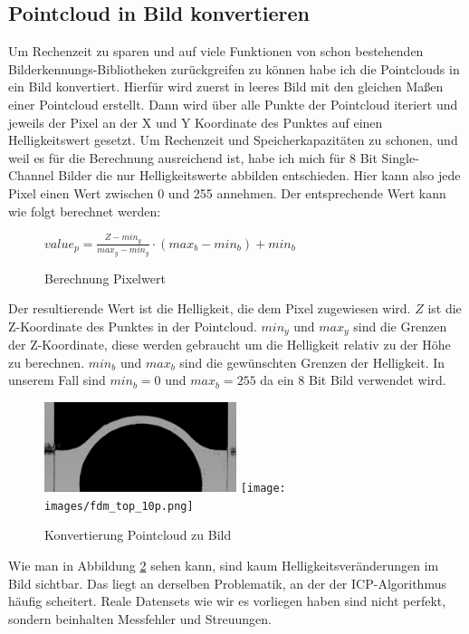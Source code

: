 \documentclass[../main.tex]{subfiles}
\begin{document}
\subsection{Pointcloud in Bild konvertieren}

Um Rechenzeit zu sparen und auf viele Funktionen von schon bestehenden 
Bilderkennungs-Bibliotheken zurückgreifen zu können habe ich die Pointclouds in ein
Bild konvertiert. Hierfür wird zuerst in leeres Bild mit den gleichen Maßen einer 
Pointcloud erstellt. Dann wird über alle Punkte der Pointcloud iteriert und jeweils
der Pixel an der X und Y Koordinate des Punktes auf einen Helligkeitswert gesetzt.
Um Rechenzeit und Speicherkapazitäten zu schonen, und weil es für die Berechnung 
ausreichend ist, habe ich mich für 8 Bit Single-Channel Bilder die nur Helligkeitswerte 
abbilden entschieden. Hier kann also jede Pixel einen Wert zwischen 0 und 255 annehmen.
Der entsprechende Wert kann wie folgt berechnet werden:

\begin{figure}
    \centering
    $value_p = \frac{Z - min_y}{max_y - min_y} \cdot (max_b - min_b) + min_b$
    \caption{Berechnung Pixelwert}
    \label{calc:brightness}
\end{figure}
Der resultierende Wert ist die Helligkeit, die dem Pixel zugewiesen wird.
$Z$ ist die Z-Koordinate des Punktes in der Pointcloud. $min_y$ und $max_y$ sind 
die Grenzen der Z-Koordinate, diese werden gebraucht um die Helligkeit relativ 
zu der Höhe zu berechnen. $min_b$ und $max_b$ sind die gewünschten Grenzen der 
Helligkeit. In unserem Fall sind $min_b = 0$ und $max_b = 255$ da ein 8 Bit Bild
verwendet wird.

\begin{figure}
    \centering
    \includegraphics[width=0.5\textwidth]{images/fdm_top_100p.png}
    \texttt{[image: images/fdm\_top\_10p.png]}
    \caption{Konvertierung Pointcloud zu Bild}
    \label{fig:image_from_pc}
\end{figure}

Wie man in Abbildung \ref{fig:image_from_pc} sehen kann, sind kaum Helligkeitsveränderungen
im Bild sichtbar. Das liegt an derselben Problematik, an der der ICP-Algorithmus häufig
scheitert. Reale Datensets wie wir es vorliegen haben sind nicht perfekt, sondern
beinhalten Messfehler und Streuungen. 
\end{document}
